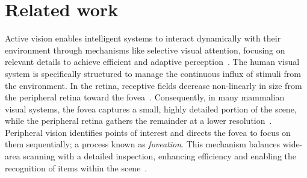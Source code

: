 \section{Related work}
\label{ch:relworks} 

Active vision enables intelligent systems to interact dynamically with their environment through mechanisms like selective visual attention, focusing on relevant details to achieve efficient and adaptive perception~\cite{rizzolatti1983mechanisms}. The human visual system is specifically structured to manage the continuous influx of stimuli from the environment. In the retina, receptive fields decrease non-linearly in size from the peripheral retina toward the fovea~\cite{harvey2011relationship}. Consequently, in many mammalian visual systems, the fovea captures a small, highly detailed portion of the scene, while the peripheral retina gathers the remainder at a lower resolution~\cite{Biologyfoveation}. Peripheral vision identifies points of interest and directs the fovea to focus on them sequentially; a process known as \textit{foveation}. This mechanism balances wide-area scanning with a detailed inspection, enhancing efficiency and enabling the recognition of items within the scene~\cite{DigitalFoveation}.

